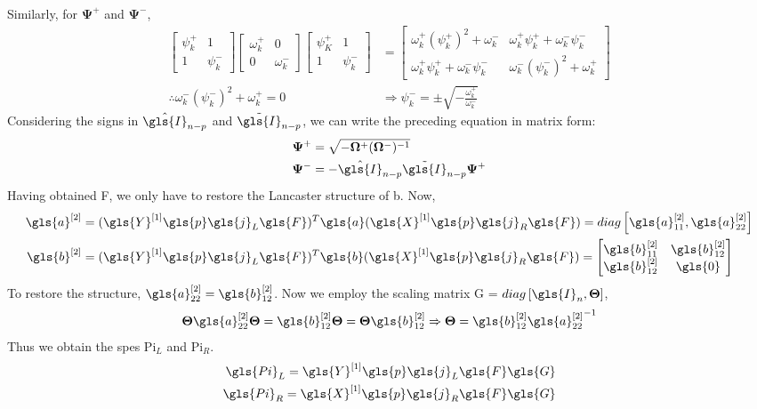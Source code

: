 Similarly, for $\mathbf{\Psi}^+$ and $\mathbf{\Psi}^-$, 
\begin{align}
\begin{bmatrix}
\psi_k^+ & 1\\
1 & \psi_k^-   
\end{bmatrix}
\begin{bmatrix}
\omega_k^+ & 0\\
0 & \omega_k^-   
\end{bmatrix}
\begin{bmatrix}
\psi_K^+ & 1\\
1 & \psi_k^-   
\end{bmatrix} &= 
\begin{bmatrix}
\omega_k^+(\psi_k^+)^2 + \omega_k^- & \omega_k^+\psi_k^+  + \omega_k^-\psi_k^-\\
\omega_k^+\psi_k^+ +  \omega_k^-\psi_k^- & \omega_k^-(\psi_k^-)^2 + \omega_k^+ 
\end{bmatrix}\\
\therefore\omega_k^-(\psi_k^-)^2 + \omega_k^+ = 0 &\Rightarrow \psi_k^- = \pm\sqrt{-\frac{ \omega_k^+}{ \omega_k^-}}
\end{align}
Considering the signs in $\hat{\gls{I}}_{n-p}$ and $\tilde{\gls{I}}_{n-p}$, we can 
write the preceding equation in matrix form:
\begin{subequations}
\label{eqn:psi}
\begin{align}
	\mathbf{\Psi}^+ &= \sqrt{-\mathbf{\Omega}^+(\mathbf{\Omega}^-)^{-1}}\\
	\mathbf{\Psi}^- &= -\hat{\gls{I}}_{n-p}\tilde{\gls{I}}_{n-p}\mathbf{\Psi}^+
\end{align}
\end{subequations}
Having obtained \gls{F}, we only have to restore the Lancaster structure
of \gls{b}. Now,
\begin{align}
	\gls{a}^{[2]} &= (\gls{Y}^{[1]}\gls{p}\gls{j}_L\gls{F})^T\gls{a}(\gls{X}^{[1]}\gls{p}\gls{j}_R\gls{F}) = diag\left[\gls{a}^{[2]}_{11},\gls{a}^{[2]}_{22}\right]\\
	\gls{b}^{[2]} &= (\gls{Y}^{[1]}\gls{p}\gls{j}_L\gls{F})^T\gls{b}(\gls{X}^{[1]}\gls{p}\gls{j}_R\gls{F}) = \begin{bmatrix}	
	\gls{b}^{[2]}_{11} & \gls{b}^{[2]}_{12}\\
	\gls{b}^{[2]}_{12} & \gls{0}
	\end{bmatrix}
\end{align}
To restore the structure, $\gls{a}^{[2]}_{22} = \gls{b}^{[2]}_{12}$. Now we
employ the scaling matrix \gls{G} = $diag\left[\gls{I}_{n},\mathbf{\Theta}\right]$,
\begin{align}
\mathbf{\Theta}\gls{a}^{[2]}_{22}\mathbf{\Theta} = \gls{b}^{[2]}_{12}\mathbf{\Theta} = \mathbf{\Theta}\gls{b}^{[2]}_{12} \Rightarrow \mathbf{\Theta} = \gls{b}^{[2]}_{12}{\gls{a}^{[2]}_{22}}^{-1} \label{eqn:theta}
\end{align}
Thus we obtain the \glspl{spe} \gls{Pi}$_L$ and \gls{Pi}$_R$.
\begin{subequations}
\begin{align}
\gls{Pi}_L = \gls{Y}^{[1]}\gls{p}\gls{j}_L\gls{F}\gls{G}\\
\gls{Pi}_R = \gls{X}^{[1]}\gls{p}\gls{j}_R\gls{F}\gls{G}
\end{align}
\end{subequations}